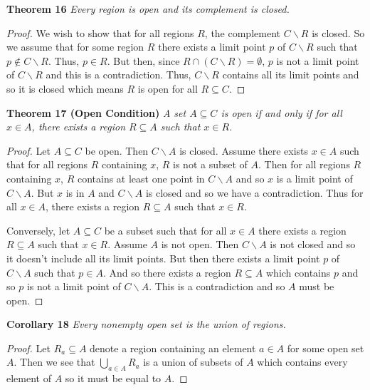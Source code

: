 \documentclass{article}
\begin{document}
\begin{flushleft}
\textbf{Theorem 16}
\textsl{Every region is open and its complement is closed.}
\begin{proof}
We wish to show that for all regions $R$, the complement $C \backslash R$ is closed. So we assume that for some region $R$ there exists a limit point $p$ of $C \backslash R$ such that $p \notin C \backslash R$. Thus, $p \in R$. But then, since $R \cap (C \backslash R) = \emptyset$, $p$ is not a limit point of $C \backslash R$ and this is a contradiction. Thus, $C \backslash R$ contains all its limit points and so it is closed which means $R$ is open for all $R \subseteq C$.
\end{proof}

\textbf{Theorem 17 (Open Condition)}
\textsl{A set $A \subseteq C$ is open if and only if for all $x \in A$, there exists a region $R \subseteq A$ such that $x \in R$.}
\begin{proof}
Let $A \subseteq C$ be open. Then $C \backslash A$ is closed. Assume there exists $x \in A$ such that for all regions $R$ containing $x$, $R$ is not a subset of $A$. Then for all regions $R$ containing $x$, $R$ contains at least one point in $C \backslash A$ and so $x$ is a limit point of $C \backslash A$. But $x$ is in $A$ and $C \backslash A$ is closed and so we have a contradiction. Thus for all $x \in A$, there exists a region $R \subseteq A$ such that $x \in R$.\newline

Conversely, let $A \subseteq C$ be a subset such that for all $x \in A$ there exists a region $R \subseteq A$ such that $x \in R$. Assume $A$ is not open. Then $C \backslash A$ is not closed and so it doesn't include all its limit points. But then there exists a limit point $p$ of $C \backslash A$ such that $p \in A$. And so there exists a region $R \subseteq A$ which contains $p$ and so $p$ is not a limit point of $C \backslash A$. This is a contradiction and so $A$ must be open.
\end{proof}

\textbf{Corollary 18}
\textsl{Every nonempty open set is the union of regions.}
\begin{proof}
Let $R_a \subseteq A$ denote a region containing an element $a \in A$ for some open set $A$. Then we see that $\bigcup_{a \in A} R_a$ is a union of subsets of $A$ which contains every element of $A$ so it must be equal to $A$.
\end{proof}

\end{flushleft}
\end{document}
